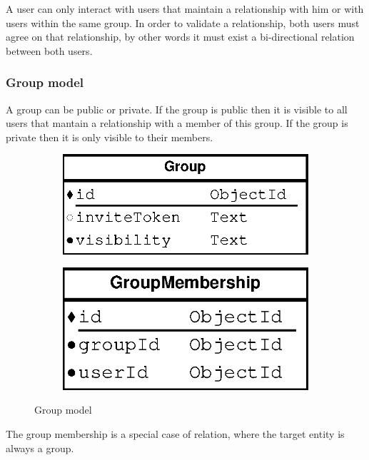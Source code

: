 A user can only interact with users that maintain a relationship with him or with users within the same group. In order to validate a relationship, both users must agree on that relationship, by other words it must exist a bi-directional relation between both users.

\subsubsection{Group model}

A group can be public or private. If the group is public then it is visible to all users that mantain a relationship with a member of this group. If the group is private then it is only visible to their members.

\begin{figure}[H]
    \centering
    \begin{subfigure}[b]{0.3\textwidth}
    	\includegraphics[width=\textwidth]{figures/model_group}
    \end{subfigure}
    \begin{subfigure}[b]{0.3\textwidth}
    	\includegraphics[width=\textwidth]{figures/model_group_membership}
    \end{subfigure}
    \caption{Group model}
\end{figure} 

The group membership is a special case of relation, where the target entity is always a group.

